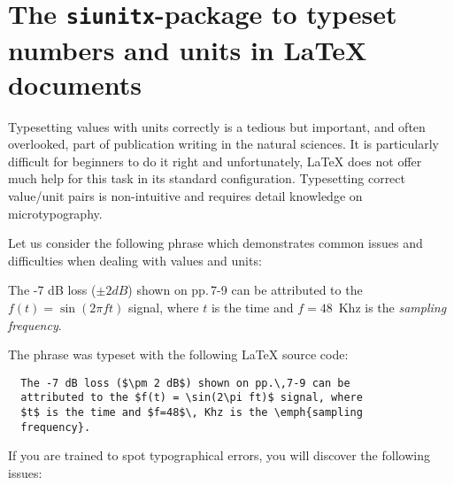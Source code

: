 \documentclass[12pt, a4paper]{scrartcl}
\begin{document}
%
\section{The \texttt{siunitx}-package to typeset
  numbers and units in \LaTeX{} documents}
Typesetting values with units correctly is a tedious but important,
and often overlooked, part of publication writing in the natural
sciences. It is particularly difficult for beginners to do it right
and unfortunately, \LaTeX{} does not offer much help for this task in
its standard configuration. Typesetting correct value/unit pairs is
non-intuitive and requires detail knowledge on microtypography.

Let us consider the following phrase which demonstrates common
issues and difficulties when dealing with values and units:
%
\begin{mdframed}[style=wrong,frametitle=values and units with errors]
  The -7 dB loss ($\pm 2 dB$) shown on pp.\,7-9 can be attributed to the
  $f(t) = \sin(2\pi ft)$ signal, where $t$ is the time and $f=48$\, Khz
  is the \emph{sampling frequency}.
\end{mdframed}
%
The phrase was typeset with the following \LaTeX{} source code:
%
\begin{mdframed}[style=wrong, frametitle=values and units with errors
  (\LaTeX{} source)]
  \begin{lstlisting}
  The -7 dB loss ($\pm 2 dB$) shown on pp.\,7-9 can be
  attributed to the $f(t) = \sin(2\pi ft)$ signal, where
  $t$ is the time and $f=48$\, Khz is the \emph{sampling
  frequency}.
  \end{lstlisting}
\end{mdframed}
%
If you are trained to spot typographical errors, you will discover the
following issues:
%
\end{document}

